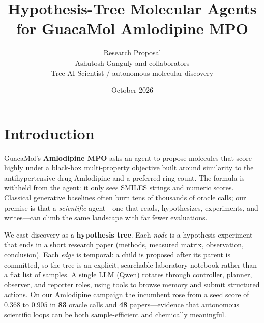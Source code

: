 \documentclass[11pt]{article}
\title{\vspace{-1.2em}\bfseries Hypothesis-Tree Molecular Agents for GuacaMol Amlodipine MPO}
\author{\vspace{-0.4em}Research Proposal \\[0.2em]
\small Ashutosh Ganguly and collaborators \\
\small Tree AI Scientist / autonomous molecular discovery}
\date{\vspace{-0.6em}\small October 2026}
\begin{document}
\maketitle
\vspace{-1.2em}

\section{Introduction}
GuacaMol's \textbf{Amlodipine MPO} asks an agent to propose molecules that score highly under a black-box multi-property objective built around similarity to the antihypertensive drug Amlodipine and a preferred ring count. The formula is withheld from the agent: it only sees SMILES strings and numeric scores. Classical generative baselines often burn tens of thousands of oracle calls; our premise is that a \emph{scientific} agent---one that reads, hypothesizes, experiments, and writes---can climb the same landscape with far fewer evaluations.

We cast discovery as a \textbf{hypothesis tree}. Each \emph{node} is a hypothesis experiment that ends in a short research paper (methods, measured matrix, observation, conclusion). Each \emph{edge} is temporal: a child is proposed after its parent is committed, so the tree is an explicit, searchable laboratory notebook rather than a flat list of samples. A single LLM (Qwen) rotates through controller, planner, observer, and reporter roles, using tools to browse memory and submit structured actions. On our Amlodipine campaign the incumbent rose from a seed score of $\mathbf{0.368}$ to $\mathbf{0.905}$ in \textbf{83} oracle calls and \textbf{48} papers---evidence that autonomous scientific loops can be both sample-efficient and chemically meaningful.
\end{document}
